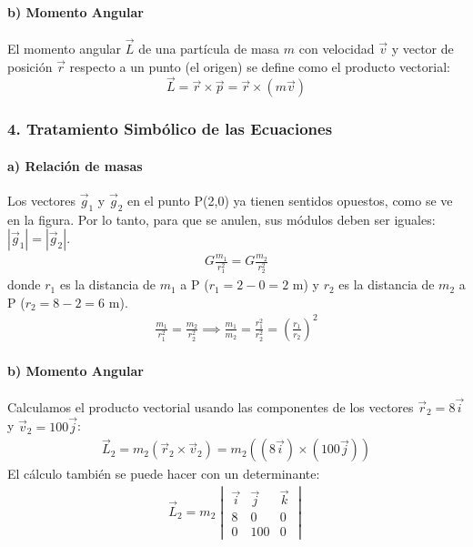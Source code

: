 \paragraph{b) Momento Angular}
El momento angular $\vec{L}$ de una partícula de masa $m$ con velocidad $\vec{v}$ y vector de posición $\vec{r}$ respecto a un punto (el origen) se define como el producto vectorial:
$$ \vec{L} = \vec{r} \times \vec{p} = \vec{r} \times (m\vec{v}) $$

\subsubsection*{4. Tratamiento Simbólico de las Ecuaciones}
\paragraph{a) Relación de masas}
Los vectores $\vec{g}_1$ y $\vec{g}_2$ en el punto P(2,0) ya tienen sentidos opuestos, como se ve en la figura. Por lo tanto, para que se anulen, sus módulos deben ser iguales: $|\vec{g}_1| = |\vec{g}_2|$.
\begin{gather}
    G\frac{m_1}{r_1^2} = G\frac{m_2}{r_2^2}
\end{gather}
donde $r_1$ es la distancia de $m_1$ a P ($r_1 = 2-0 = 2$ m) y $r_2$ es la distancia de $m_2$ a P ($r_2 = 8-2 = 6$ m).
\begin{gather}
    \frac{m_1}{r_1^2} = \frac{m_2}{r_2^2} \implies \frac{m_1}{m_2} = \frac{r_1^2}{r_2^2} = \left(\frac{r_1}{r_2}\right)^2
\end{gather}

\paragraph{b) Momento Angular}
Calculamos el producto vectorial usando las componentes de los vectores $\vec{r}_2 = 8\vec{i}$ y $\vec{v}_2 = 100\vec{j}$:
\begin{gather}
    \vec{L}_2 = m_2 (\vec{r}_2 \times \vec{v}_2) = m_2 ((8\vec{i}) \times (100\vec{j}))
\end{gather}
El cálculo también se puede hacer con un determinante:
\begin{gather}
    \vec{L}_2 = m_2 \begin{vmatrix}
    \vec{i} & \vec{j} & \vec{k} \\
    8 & 0 & 0 \\
    0 & 100 & 0
    \end{vmatrix}
\end{gather}

